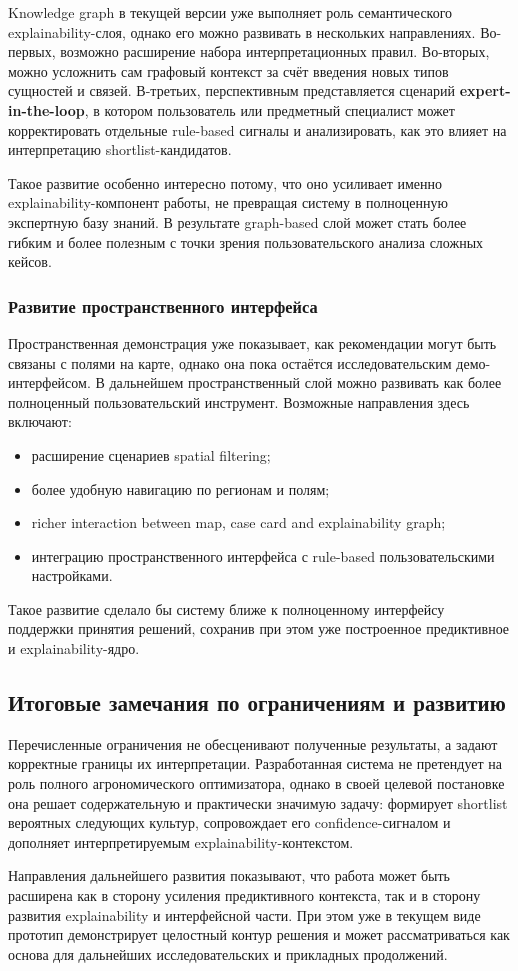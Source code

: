 Knowledge graph в текущей версии уже выполняет роль семантического explainability-слоя, однако его можно развивать в
нескольких направлениях. Во-первых, возможно расширение набора интерпретационных правил. Во-вторых, можно усложнить сам
графовый контекст за счёт введения новых типов сущностей и связей. В-третьих, перспективным представляется сценарий
\textbf{expert-in-the-loop}, в котором пользователь или предметный специалист может корректировать отдельные rule-based
сигналы и анализировать, как это влияет на интерпретацию shortlist-кандидатов.

Такое развитие особенно интересно потому, что оно усиливает именно explainability-компонент работы, не превращая систему
в полноценную экспертную базу знаний. В результате graph-based слой может стать более гибким и более полезным с точки
зрения пользовательского анализа сложных кейсов.

\subsubsection{Развитие пространственного интерфейса}

Пространственная демонстрация уже показывает, как рекомендации могут быть связаны с полями на карте, однако она пока
остаётся исследовательским демо-интерфейсом. В дальнейшем пространственный слой можно развивать как более полноценный
пользовательский инструмент. Возможные направления здесь включают:

\begin{itemize}
\tightlist
\item
  расширение сценариев spatial filtering;
\item
  более удобную навигацию по регионам и полям;
\item
  richer interaction between map, case card and explainability graph;
\item
  интеграцию пространственного интерфейса с rule-based пользовательскими настройками.
\end{itemize}

Такое развитие сделало бы систему ближе к полноценному интерфейсу поддержки принятия решений, сохранив при этом уже
построенное предиктивное и explainability-ядро.

\subsection{Итоговые замечания по ограничениям и развитию}

Перечисленные ограничения не обесценивают полученные результаты, а задают корректные границы их интерпретации.
Разработанная система не претендует на роль полного агрономического оптимизатора, однако в своей целевой постановке она
решает содержательную и практически значимую задачу: формирует shortlist вероятных следующих культур, сопровождает его
confidence-сигналом и дополняет интерпретируемым explainability-контекстом.

Направления дальнейшего развития показывают, что работа может быть расширена как в сторону усиления предиктивного
контекста, так и в сторону развития explainability и интерфейсной части. При этом уже в текущем виде прототип
демонстрирует целостный контур решения и может рассматриваться как основа для дальнейших исследовательских и прикладных
продолжений.
